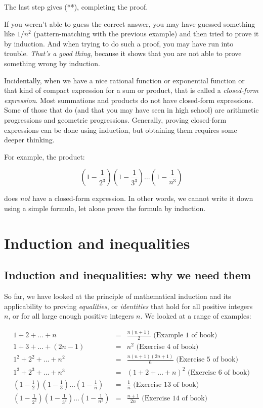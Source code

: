 \documentclass{amsart}
\begin{document}
The last step gives (**), completing the proof.

If you weren't able to guess the correct answer, you may have guessed
something like $1/n^2$ (pattern-matching with the previous example)
and then tried to prove it by induction. And when trying to do such a
proof, you may have run into trouble. {\em That's a good thing},
because it shows that you are not able to prove something wrong by
induction.

Incidentally, when we have a nice rational function or exponential
function or that kind of compact expression for a sum or product, that
is called a {\em closed-form expression}. Most summations and products
do not have closed-form expressions. Some of those that do (and that
you may have seen in high school) are arithmetic progressions and
geometric progressions. Generally, proving closed-form expressions can
be done using induction, but obtaining them requires some deeper
thinking.

For example, the product:

$$\left(1 - \frac{1}{2^3}\right)\left(1 - \frac{1}{3^3}\right) \dots \left(1 - \frac{1}{n^3}\right)$$

does {\em not} have a closed-form expression. In other words, we
cannot write it down using a simple formula, let alone prove the
formula by induction.

\section{Induction and inequalities}

\subsection{Induction and inequalities: why we need them}

So far, we have looked at the principle of mathematical induction and
its applicability to proving {\em equalities}, or {\em identities}
that hold for all positive integers $n$, or for all large enough
positive integers $n$. We looked at a range of examples:

\begin{eqnarray*}
  1 + 2 + \dots + n & = & \frac{n(n+1)}{2} \text{ (Example 1 of book) }\\
  1 + 3 + \dots + (2n - 1) & = & n^2 \text{ (Exercise 4 of book) }\\
  1^2 + 2^2 + \dots + n^2 & = & \frac{n(n+1)(2n + 1)}{6} \text{ (Exercise 5 of book) }\\
  1^3 + 2^3 + \dots + n^3 & = & (1 + 2 + \dots + n)^2 \text{ (Exercise 6 of book)}\\
  \left(1 - \frac{1}{2}\right)\left(1 - \frac{1}{3}\right) \dots \left(1 - \frac{1}{n}\right) & = & \frac{1}{n} \text{ (Exercise 13 of book) }\\
  \left(1 - \frac{1}{2^2}\right)\left(1 - \frac{1}{3^2} \right) \dots \left(1 - \frac{1}{n^2}\right) & = & \frac{n +1}{2n} \text{ (Exercise 14 of book) }
\end{eqnarray*}
\end{document}
